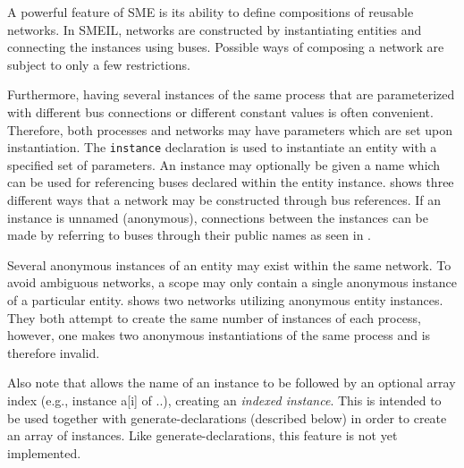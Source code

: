 A powerful feature of SME is its ability to define compositions of reusable
networks. In SMEIL, networks are constructed by instantiating entities and
connecting the instances using buses. Possible ways of composing a network are
subject to only a few restrictions.

Furthermore, having several instances of the same process that are parameterized
with different bus connections or different constant values is often
convenient. Therefore, both processes and networks may have parameters which are
set upon instantiation.
The {\tt instance}
declaration is used to instantiate an entity with a specified set of
parameters. An instance may optionally be given a name which can be used for
referencing buses declared within the entity instance.  shows
three different ways that a network may be constructed through bus
references. If an instance is unnamed (anonymous), connections between the
instances can be made by referring to buses through their public names as seen
in .
\enlargethispage{2em}

Several anonymous instances of an entity may exist within the same network. To
avoid ambiguous networks, a scope may only contain a single anonymous instance
of a particular entity.   shows two networks utilizing
anonymous entity instances. They both attempt to create the same number of
instances of each process, however, one makes two anonymous instantiations of
the same process and is therefore invalid.

Also note that {\itshape <instance-name>} allows the name of an instance to be
followed by an optional array index (e.g., {\ttfamily instance a[i] of ..}),
creating an {\itshape indexed instance}. This is intended to be used together
with {\ttfamily generate}-declarations (described below) in order to create an
array of instances. Like {\ttfamily generate}-declarations, this feature is not
yet implemented.

